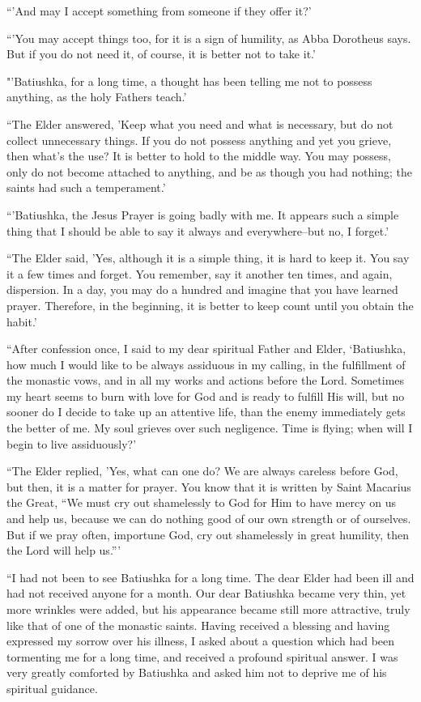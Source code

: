 “'And may I accept something from someone if they offer it?'

“'You may accept things too, for it is a sign of humility, as Abba Dorotheus says. But if you do not need it, of course, it is better not to take it.'

"'Batiushka, for a long time, a thought has been telling me not to possess anything, as the holy Fathers teach.'

“The Elder answered, 'Keep what you need and what is necessary, but do not collect unnecessary things. If you do not possess anything and yet you grieve, then what's the use? It is better to hold to the middle way. You may possess, only do not become attached to anything, and be as though you had nothing; the saints had such a temperament.'

“'Batiushka, the Jesus Prayer is going badly with me. It appears such a simple thing that I should be able to say it always and everywhere--but no, I forget.'

“The Elder said, 'Yes, although it is a simple thing, it is hard to keep it. You say it a few times and forget. You remember, say it another ten times, and again, dispersion. In a day, you may do a hundred and imagine that you have learned prayer. Therefore, in the beginning, it is better to keep count until you obtain the habit.'

“After confession once, I said to my dear spiritual Father and Elder, ‘Batiushka, how much I would like to be always assiduous in my calling, in the fulfillment of the monastic vows, and in all my works and actions before the Lord. Sometimes my heart seems to burn with love for God and is ready to fulfill His will, but no sooner do I decide to take up an attentive life, than the enemy immediately gets the better of me. My soul grieves over such negligence. Time is flying; when will I begin to live assiduously?'

“The Elder replied, 'Yes, what can one do? We are always careless before God, but then, it is a matter for prayer. You know that it is written by Saint Macarius the Great, “We must cry out shamelessly to God for Him to have mercy on us and help us, because we can do nothing good of our own strength or of ourselves. But if we pray often, importune God, cry out shamelessly in great humility, then the Lord will help us.'''

“I had not been to see Batiushka for a long time. The dear Elder had been ill and had not received anyone for a month. Our dear Batiushka became very thin, yet more wrinkles were added, but his appearance became still more attractive, truly like that of one of the monastic saints. Having received a blessing and having expressed my sorrow over his illness, I asked about a question which had been tormenting me for a long time, and received a profound spiritual answer. I was very greatly comforted by Batiushka and asked him not to deprive me of his spiritual guidance.


